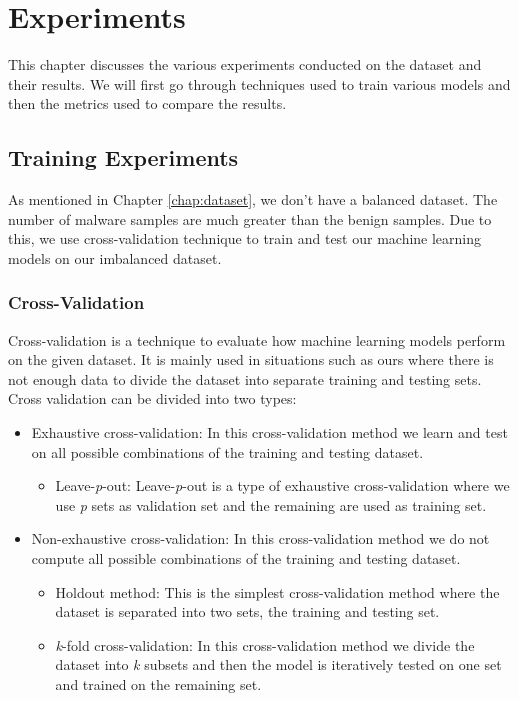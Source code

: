 \chapter{Experiments\label{chap:experiments}}

This chapter discusses the various experiments conducted on the dataset and their results. We will first go through techniques used to train various models and then the metrics used to compare the results.

\section{Training Experiments}

As mentioned in Chapter \ref{chap:dataset}, we don't have a balanced dataset. The number of malware samples are much greater than the benign samples. Due to this, we use cross-validation technique to train and test our machine learning models on our imbalanced dataset.

\subsection{Cross-Validation}

Cross-validation is a technique to evaluate how machine learning models perform on the given dataset. It is mainly used in situations such as ours where there is not enough data to divide the dataset into separate training and testing sets. Cross validation can be divided into two types:

\begin{itemize}
	\item Exhaustive cross-validation:
	In this cross-validation method we learn and test on all possible combinations of the training and testing dataset.
	\begin{itemize}
		\item Leave-\emph{p}-out:
		Leave-\emph{p}-out is a type of exhaustive cross-validation where we use \emph{p} sets as validation set and the remaining are used as training set.
	\end{itemize}
	\item Non-exhaustive cross-validation:
	In this cross-validation method we do not compute all possible combinations of the training and testing dataset.
	\begin{itemize}
		\item Holdout method:
		This is the simplest cross-validation method where the dataset is separated into two sets, the training and testing set.
		\item \emph{k}-fold cross-validation:
		In this cross-validation method we divide the dataset into \emph{k} subsets and then the model is iteratively tested on one set and trained on the remaining set.
	\end{itemize}
\end{itemize}


